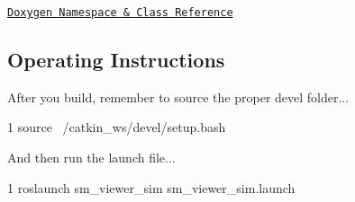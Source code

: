 \href{https://reelrbtx.github.io/SMACC/master/html/namespacesm__viewer__sim.html}{\tt Doxygen Namespace \& Class Reference}

\subsection*{Operating Instructions}

After you build, remember to source the proper devel folder...


\begin{DoxyCode}
1 source ~/catkin\_ws/devel/setup.bash
\end{DoxyCode}


And then run the launch file...


\begin{DoxyCode}
1 roslaunch sm\_viewer\_sim sm\_viewer\_sim.launch
\end{DoxyCode}
 